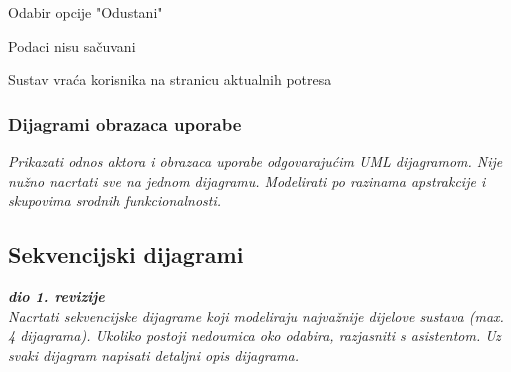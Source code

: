 \begin{packed_item}
\begin{packed_item}
\begin{packed_enum}
					\end{packed_enum}
					
					\item[7.a] Odabir opcije "Odustani"
					\item[] \begin{packed_enum}
						
						\item Podaci nisu sačuvani
						\item Sustav vraća korisnika na stranicu aktualnih potresa
						
					\end{packed_enum}
					
				\end{packed_item}
				
			\end{packed_item}			
					
				\subsubsection{Dijagrami obrazaca uporabe}
					
					\textit{Prikazati odnos aktora i obrazaca uporabe odgovarajućim UML dijagramom. Nije nužno nacrtati sve na jednom dijagramu. Modelirati po razinama apstrakcije i skupovima srodnih funkcionalnosti.}
				\eject		
				
			\subsection{Sekvencijski dijagrami}
				
				\textbf{\textit{dio 1. revizije}}\\
				
				\textit{Nacrtati sekvencijske dijagrame koji modeliraju najvažnije dijelove sustava (max. 4 dijagrama). Ukoliko postoji nedoumica oko odabira, razjasniti s asistentom. Uz svaki dijagram napisati detaljni opis dijagrama.}
				\eject
	
